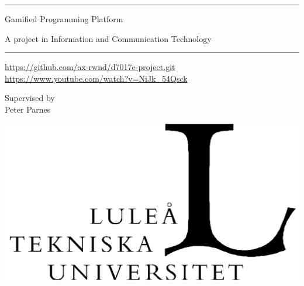 \vspace{2\baselineskip}

\rule{\linewidth}{.02cm}

\vspace{\baselineskip}

\begin{minipage}{.45\linewidth}
\raggedright\Huge Gamified Programming Platform
\end{minipage}
\hfill
\begin{minipage}{.45\linewidth}
\raggedleft\Large A project in Information and Communication Technology
\end{minipage}

\vspace{-2\baselineskip}

\vfill

\Large\it\LTU

\vspace{-.33\baselineskip}
\rule{\widthof{\LTU{}}}{.02cm}
\vspace{.66\baselineskip}

\begin{minipage}{.45\linewidth}
\Large\it\SRT
\end{minipage}

\vfill

\begin{center}
\textnormal{
\normalsize\url{https://github.com/ax-rwnd/d7017e-project.git} \\
\normalsize\url{https://www.youtube.com/watch?v=NiJk_54Qsck}
}
\end{center}

\vfill

\begin{minipage}[b]{.45\linewidth}
{\large Supervised by\\ Peter Parnes}
\vspace{\baselineskip}
\end{minipage}
\hfill
\begin{minipage}[b]{.35\linewidth}
\includegraphics[width=\linewidth]{img/LTU_logo.png}
\end{minipage}
